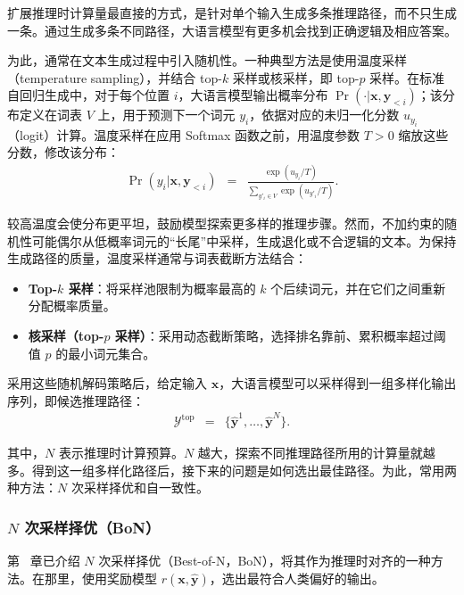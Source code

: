 扩展推理时计算量最直接的方式，是针对单个输入生成多条推理路径，而不只生成一条。通过生成多条不同路径，大语言模型有更多机会找到正确逻辑及相应答案。

为此，通常在文本生成过程中引入随机性。一种典型方法是使用温度采样（temperature sampling），并结合 top-$k$ 采样或核采样，即 top-$p$ 采样。在标准自回归生成中，对于每个位置 $i$，大语言模型输出概率分布 $\Pr(\cdot | \mathbf{x}, \mathbf{y}_{< i})$；该分布定义在词表 $V$ 上，用于预测下一个词元 $y_i$，依据对应的未归一化分数 $u_{y_i}$（logit）计算。温度采样在应用 Softmax 函数之前，用温度参数 $T > 0$ 缩放这些分数，修改该分布：
\begin{eqnarray}
\Pr(y_i | \mathbf{x}, \mathbf{y}_{< i}) & = & \frac{\exp(u_{y_i} / T)}{\sum_{y'_i \in V} \exp(u_{y'_i} / T)}.
\end{eqnarray}

\noindent 较高温度会使分布更平坦，鼓励模型探索更多样的推理步骤。然而，不加约束的随机性可能偶尔从低概率词元的“长尾”中采样，生成退化或不合逻辑的文本。为保持生成路径的质量，温度采样通常与词表截断方法结合：

\begin{itemize}
\item \vspace{0.5em} \textbf{Top-$k$ 采样}：将采样池限制为概率最高的 $k$ 个后续词元，并在它们之间重新分配概率质量。
\item \vspace{0.3em} \textbf{核采样（top-$p$ 采样）}：采用动态截断策略，选择排名靠前、累积概率超过阈值 $p$ 的最小词元集合。
\end{itemize}
\vspace{0.5em}

采用这些随机解码策略后，给定输入 $\mathbf{x}$，大语言模型可以采样得到一组多样化输出序列，即候选推理路径：
\begin{eqnarray}
\mathcal{Y}^{\mathrm{top}} & = & \{\hat{\mathbf{y}}^1, \dots, \hat{\mathbf{y}}^N\}.
\end{eqnarray}

\noindent 其中，$N$ 表示推理时计算预算。$N$ 越大，探索不同推理路径所用的计算量就越多。得到这一组多样化路径后，接下来的问题是如何选出最佳路径。为此，常用两种方法：$N$ 次采样择优和自一致性。

\subsubsection{$N$ 次采样择优（BoN）}
第 \ChapterLLMTuning\ 章已介绍 $N$ 次采样择优（Best-of-N，BoN），将其作为推理时对齐的一种方法。在那里，使用奖励模型 $r(\mathbf{x}, \hat{\mathbf{y}})$，选出最符合人类偏好的输出。

